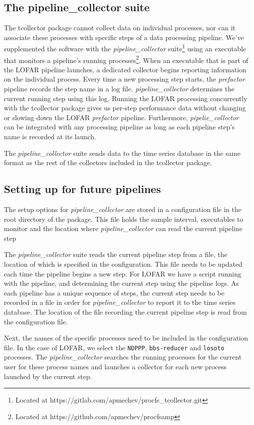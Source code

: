 \begin{subappendices}
\subsection{The pipeline\_collector suite}\label{sec:ch4_customcollectors}



The tcollector package cannot collect data on individual processes, nor can it associate these processes with specific steps of a data processing pipeline. We've supplemented the software with the \textit{pipeline\_collector} suite\footnote{Located at https://gitlab.com/apmechev/procfs\_tcollector.git} using an executable that monitors a pipeline's running processes\footnote{Located at https://github.com/apmechev/procfsamp}. When an executable that is part of the LOFAR pipeline launches, a dedicated collector begins reporting information on the individual process. Every time a new processing step starts, the \textit{prefactor} pipeline records the step name in a log file. \textit{pipeline\_collector} determines the current running step using this log. Running the LOFAR processing concurrently with the tcollector package gives us per-step performance data without changing or slowing down the LOFAR \textit{prefactor} pipeline. Furthermore, \textit{pipelie\_collector} can be integrated with any processing pipeline as long as each pipeline step's name is recorded at its launch. 

The \textit{pipeline\_collector} suite sends data to the time series database in the same format as the rest of the collectors included in the tcollector package. 

\subsection{Setting up for future pipelines}

The setup options for \textit{pipeline\_collector} are stored in a configuration file in the root directory of the package. This file holds the sample interval, executables to monitor and the location where \textit{pipeline\_collector} can read the current pipeline step

The \textit{pipeline\_collector} suite reads the current pipeline step from a file, the location of which is specified in the configuration. This file needs to be updated each time the pipeline begins a new step. For LOFAR we have a script running with the pipeline, and determining the current step using the pipeline logs. As each pipeline has a unique sequence of steps, the current step needs to be recorded in a file in order for \textit{pipeline\_collector} to report it to the time series database. The location of the file recording the current pipeline step is read from the configuration file. 

Next, the names of the specific processes need to be included in the configuration file. In the case of LOFAR, we select the \texttt{NDPPP}, \texttt{bbs-reducer} and \texttt{losoto} processes. The \textit{pipeline\_collector} searches the running processes for the current user for these process names and launches a collector for each new process launched by the current step. 
\end{subappendices}
